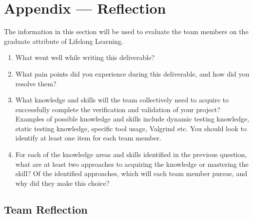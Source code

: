 \documentclass[12pt, titlepage]{article}
\begin{document}
\newpage{}
\section*{Appendix --- Reflection}

The information in this section will be used to evaluate the team members on the
graduate attribute of Lifelong Learning.



\begin{enumerate}
  \item What went well while writing this deliverable? 
  \item What pain points did you experience during this deliverable, and how
    did you resolve them?
  \item What knowledge and skills will the team collectively need to acquire to
  successfully complete the verification and validation of your project?
  Examples of possible knowledge and skills include dynamic testing knowledge,
  static testing knowledge, specific tool usage, Valgrind etc.  You should look to
  identify at least one item for each team member.
  \item For each of the knowledge areas and skills identified in the previous
  question, what are at least two approaches to acquiring the knowledge or
  mastering the skill?  Of the identified approaches, which will each team
  member pursue, and why did they make this choice?
\end{enumerate}

\subsection*{Team Reflection}
\end{document}
